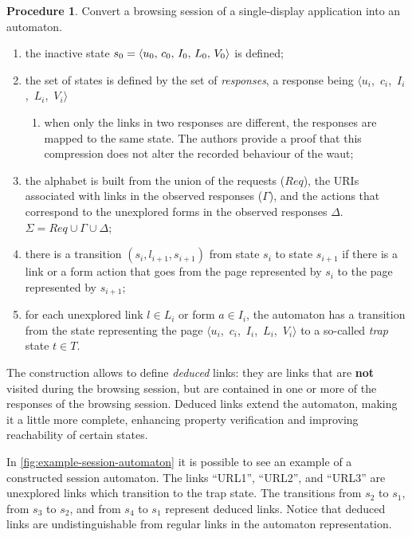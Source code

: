 \documentclass[a4paper,10pt]{article}
\newcommand{\res}[1][]{
  \ifthenelse{\equal{#1}{}}{\mbox{$\langle u$, $c$, $I$, $L$, $V\rangle$}}
  {\mbox{$\langle u_{#1}$, $c_{#1}$, $I_{#1}$, $L_{#1}$, $V_{#1}\rangle$}}
}
\theoremstyle{plain} %
\theoremstyle{definition}
\newtheorem{procedure}{Procedure}
\theoremstyle{remark}
\begin{document}
\begin{procedure}
  \label{browsing-session-to-automaton}
  Convert a browsing session of a single-display application into an automaton.

  \begin{enumerate}
    \item the inactive state $s_0 = \res[0]$ is defined;
    \item the set of states is defined by the set of \emph{responses}, a response being \res[i]
      \begin{enumerate}
        \item when only the links in two responses are different, the responses are mapped to the same state. The authors provide a proof that this compression does not alter the recorded behaviour of the \gls{waut};
      \end{enumerate}
    \item the alphabet is built from the union of the requests ($Req$), the URIs associated with links in the observed responses ($\Gamma$), and the actions that correspond to the unexplored forms in the observed responses $\Delta$. $\Sigma=Req\cup\Gamma\cup\Delta$;
    \item there is a transition $(s_i,l_{i+1},s_{i+1})$ from state $s_i$ to state $s_{i+1}$ if there is a link or a form action that goes from the page represented by $s_i$ to the page represented by $s_{i+1}$;
    \item for each unexplored link $l \in L_i$ or form $a \in I_i$, the automaton has a transition from the state representing the page \res[i] to a so-called \textit{trap} state $t \in T$.
  \end{enumerate}
\end{procedure}

The construction allows to define \emph{deduced} links: they are links that are \textbf{not} visited during the browsing session, but are contained in one or more of the responses of the browsing session. Deduced links extend the automaton, making it a little more complete, enhancing property verification and improving reachability of certain states.

In \cref{fig:example-session-automaton} it is possible to see an example of a constructed session automaton. The links ``URL1'', ``URL2'', and ``URL3'' are unexplored links which transition to the trap state. The transitions from $s_2$ to $s_1$, from $s_3$ to $s_2$, and from $s_4$ to $s_1$ represent deduced links. Notice that deduced links are undistinguishable from regular links in the automaton representation.
\end{document}
